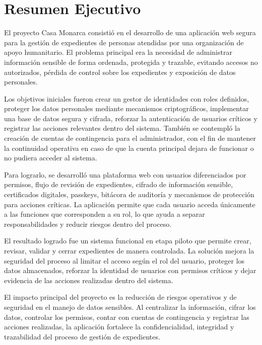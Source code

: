\documentclass[10pt, letterpaper]{article}
\begin{document}
\newpage
\tableofcontents


\listoffigures
\newpage

\section{Resumen Ejecutivo}

El proyecto Casa Monarca consistió en el desarrollo de una aplicación web segura para la gestión de expedientes de personas atendidas por una organización de apoyo humanitario. El problema principal era la necesidad de administrar información sensible de forma ordenada, protegida y trazable, evitando accesos no autorizados, pérdida de control sobre los expedientes y exposición de datos personales.

Los objetivos iniciales fueron crear un gestor de identidades con roles definidos, proteger los datos personales mediante mecanismos criptográficos, implementar una base de datos segura y cifrada, reforzar la autenticación de usuarios críticos y registrar las acciones relevantes dentro del sistema. También se contempló la creación de cuentas de contingencia para el administrador, con el fin de mantener la continuidad operativa en caso de que la cuenta principal dejara de funcionar o no pudiera acceder al sistema.

Para lograrlo, se desarrolló una plataforma web con usuarios diferenciados por permisos, flujo de revisión de expedientes, cifrado de información sensible, certificados digitales, passkeys, bitácora de auditoría y mecanismos de protección para acciones críticas. La aplicación permite que cada usuario acceda únicamente a las funciones que corresponden a su rol, lo que ayuda a separar responsabilidades y reducir riesgos dentro del proceso.

El resultado logrado fue un sistema funcional en etapa piloto que permite crear, revisar, validar y cerrar expedientes de manera controlada. La solución mejora la seguridad del proceso al limitar el acceso según el rol del usuario, proteger los datos almacenados, reforzar la identidad de usuarios con permisos críticos y dejar evidencia de las acciones realizadas dentro del sistema.

El impacto principal del proyecto es la reducción de riesgos operativos y de seguridad en el manejo de datos sensibles. Al centralizar la información, cifrar los datos, controlar los permisos, contar con cuentas de contingencia y registrar las acciones realizadas, la aplicación fortalece la confidencialidad, integridad y trazabilidad del proceso de gestión de expedientes.
\end{document}
